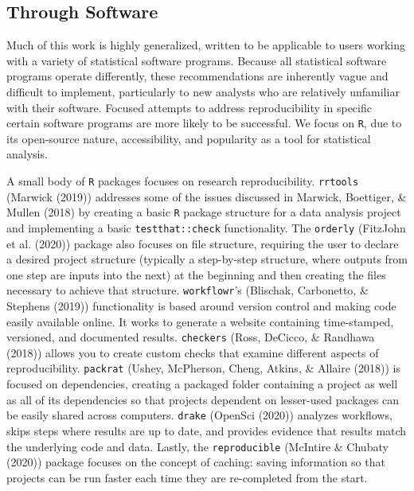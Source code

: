 \documentclass[12pt,twoside]{reedthesis}
\begin{document}
\subsection{Through Software}\label{through-software}

Much of this work is highly generalized, written to be applicable to
users working with a variety of statistical software programs. Because
all statistical software programs operate differently, these
recommendations are inherently vague and difficult to implement,
particularly to new analysts who are relatively unfamiliar with their
software. Focused attempts to address reproducibility in specific
certain software programs are more likely to be successful. We focus on
\texttt{R}, due to its open-source nature, accessibility, and popularity
as a tool for statistical analysis.

A small body of \texttt{R} packages focuses on research reproducibility.
\texttt{rrtools} (Marwick (2019)) addresses some of the issues discussed
in Marwick, Boettiger, \& Mullen (2018) by creating a basic \texttt{R}
package structure for a data analysis project and implementing a basic
\texttt{testthat::check} functionality. The \texttt{orderly} (FitzJohn
et al. (2020)) package also focuses on file structure, requiring the
user to declare a desired project structure (typically a step-by-step
structure, where outputs from one step are inputs into the next) at the
beginning and then creating the files necessary to achieve that
structure. \texttt{workflowr}'s (Blischak, Carbonetto, \& Stephens
(2019)) functionality is based around version control and making code
easily available online. It works to generate a website containing
time-stamped, versioned, and documented results. \texttt{checkers}
(Ross, DeCicco, \& Randhawa (2018)) allows you to create custom checks
that examine different aspects of reproducibility. \texttt{packrat}
(Ushey, McPherson, Cheng, Atkins, \& Allaire (2018)) is focused on
dependencies, creating a packaged folder containing a project as well as
all of its dependencies so that projects dependent on lesser-used
packages can be easily shared across computers. \texttt{drake} (OpenSci
(2020)) analyzes workflows, skips steps where results are up to date,
and provides evidence that results match the underlying code and data.
Lastly, the \texttt{reproducible} (McIntire \& Chubaty (2020)) package
focuses on the concept of caching: saving information so that projects
can be run faster each time they are re-completed from the start.
\end{document}
